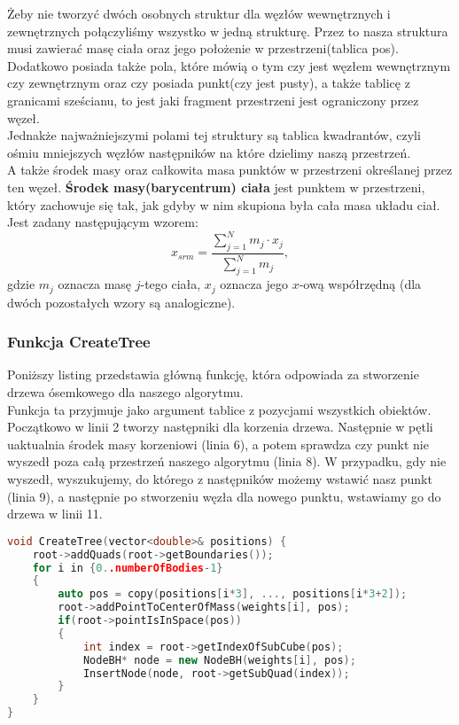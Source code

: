 \documentclass[14pt,twoside,a4paper]{article}
\theoremstyle{definition}
\begin{document}
Żeby nie tworzyć dwóch osobnych struktur dla węzłów wewnętrznych i zewnętrznych połączyliśmy wszystko w jedną strukturę. Przez to nasza struktura musi zawierać masę ciała oraz jego położenie w przestrzeni(tablica pos). Dodatkowo posiada także pola, które mówią o tym czy jest węzłem wewnętrznym czy zewnętrznym oraz czy posiada punkt(czy jest pusty), a także tablicę z granicami sześcianu, to jest jaki fragment przestrzeni jest ograniczony przez węzeł.\\
\bigskip
Jednakże najważniejszymi polami tej struktury są tablica kwadrantów, czyli ośmiu mniejszych węzłów następników na które dzielimy naszą przestrzeń. \\ A także środek masy oraz całkowita masa punktów w przestrzeni określanej przez ten węzeł. 
\textbf{Środek masy(barycentrum) ciała}  jest punktem w przestrzeni, który zachowuje się tak, jak gdyby w nim skupiona była cała masa układu ciał. Jest zadany następującym wzorem:
$$ x_{srm} = \frac{\sum_{j=1}^N m_j\cdot x_j}{\sum_{j=1}^N m_j},$$ gdzie $m_j$ oznacza masę $j$-tego ciała, $x_j$ oznacza jego $x$-ową współrzędną (dla dwóch pozostałych wzory są analogiczne). \\

\subsubsection{\large Funkcja CreateTree}
Poniższy listing przedstawia główną funkcję, która odpowiada za stworzenie drzewa ósemkowego dla naszego algorytmu.\\ 
\bigskip
Funkcja ta przyjmuje jako argument tablice z pozycjami wszystkich obiektów. 
Początkowo w linii 2 tworzy następniki dla korzenia drzewa. Następnie w pętli uaktualnia środek masy korzeniowi (linia 6), a potem sprawdza czy punkt nie wyszedł poza całą przestrzeń naszego algorytmu (linia 8). W przypadku, gdy nie wyszedł, wyszukujemy, do którego z następników możemy wstawić nasz punkt (linia 9), a następnie po stworzeniu węzła dla nowego punktu, wstawiamy go do drzewa w linii 11.
\bigskip

\begin{lstlisting}[language=C++, frame=single, framerule=2pt, caption=Pseudokod algorytmu tworzenia drzewa ósemkowego]
void CreateTree(vector<double>& positions) {
    root->addQuads(root->getBoundaries());
    for i in {0..numberOfBodies-1}
    {	
    	auto pos = copy(positions[i*3], ..., positions[i*3+2]);	        
        root->addPointToCenterOfMass(weights[i], pos);
        if(root->pointIsInSpace(pos)) 
        {
            int index = root->getIndexOfSubCube(pos);
            NodeBH* node = new NodeBH(weights[i], pos);
            InsertNode(node, root->getSubQuad(index));
        }
    }
}
\end{lstlisting}
\end{document}
